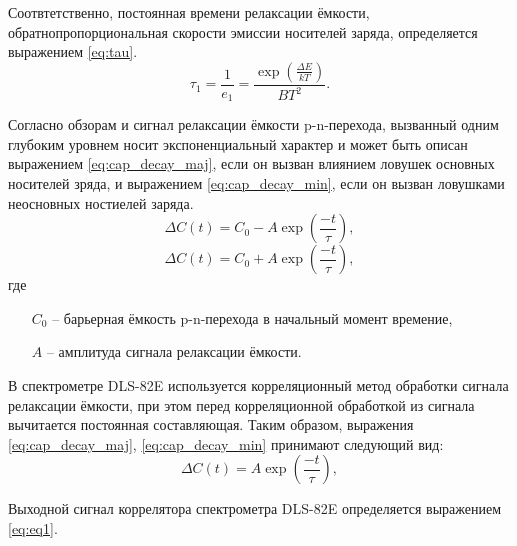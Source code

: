     Соотвтетственно, постоянная времени релаксации ёмкости, обратнопропорциональная
    скорости эмиссии носителей заряда, определяется выражением \ref{eq:tau}.
    \begin{equation}
        \label{eq:tau}
        \tau_1 = \frac{1}{e_1} = \frac{\exp\left(\frac{\Delta E}{kT}\right)}{BT^2}.
    \end{equation}

    Согласно обзорам \cite{Peaker_DLTS_review_2018} и \cite{Tin_DLTS_2012} сигнал 
    релаксации ёмкости p-n-перехода, вызванный одним глубоким уровнем носит
    экспоненциальный характер и может быть описан выражением
    \ref{eq:cap_decay_maj}, если он вызван влиянием ловушек основных носителей
    зряда, и выражением \ref{eq:cap_decay_min}, если он вызван ловушками 
    неосновных ностиелей заряда.
    \begin{equation}
        \label{eq:cap_decay_maj}
       \Delta C\left(t\right) = C_0-A\exp{\left(\frac{-t}{\tau}\right)},
    \end{equation}
    \begin{equation}
        \label{eq:cap_decay_min}
        \Delta C\left(t\right) = C_0+A\exp{\left(\frac{-t}{\tau}\right)},
    \end{equation}
    где 
    \begin{enumerate}
        \item[$C_0$] -- барьерная ёмкость p-n-перехода в начальный момент времение,
        \item[$A$] -- амплитуда сигнала релаксации ёмкости.
    \end{enumerate}

    В спектрометре DLS-82E используется корреляционный метод обработки сигнала
    релаксации ёмкости, при этом перед корреляционной обработкой из сигнала
    вычитается постоянная составляющая. Таким образом, выражения 
    \ref{eq:cap_decay_maj}, \ref{eq:cap_decay_min} принимают следующий вид:
    \begin{equation}
        \label{eq:cap_decay}
        \Delta C\left(t\right) = A\exp{\left(\frac{-t}{\tau}\right)},
    \end{equation}


    Выходной сигнал коррелятора спектрометра DLS-82E определяется 
    выражением \ref{eq:eq1}.

